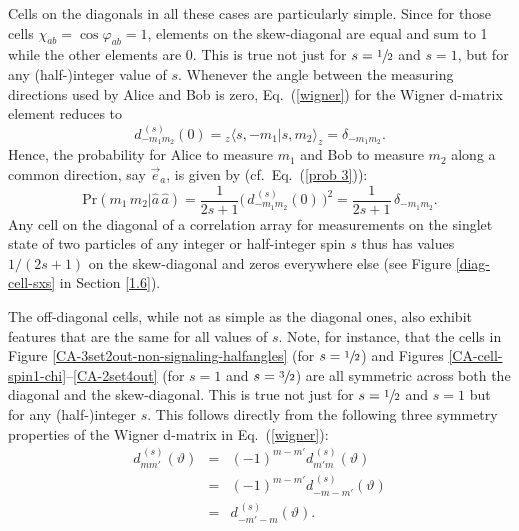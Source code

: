 Cells on the diagonals in all these cases are particularly simple. Since for those cells $\chi_{ab} = \cos{\varphi_{ab}} =1$, elements on the skew-diagonal are equal and sum to 1 while the other elements are 0. This is true not just for  $s = \sfrac12$ and $s = 1$, but for any (half-)integer value of $s$. Whenever the angle between the measuring directions used by Alice and Bob is zero,  Eq.\ (\ref{wigner}) for the Wigner d-matrix element reduces to   
\begin{equation}
d^{\,(s)}_{-m_1m_2}(0) = {_z} \langle s, -m_1  | s, m_2 \rangle_z=\delta_{-m_1m_2}.
\label{wigner zero}
\end{equation}
Hence, the probability for Alice to measure $m_1$ and Bob to measure $m_2$ along a common direction, say $\vec{e}_a$, is given by (cf.\ Eq.\ (\ref{prob 3})):
\begin{equation}
\mathrm{Pr}(m_1\, m_2 | \hat{a}\,\hat{a} ) = \frac{1}{2s+1} \Big( \, d^{\,(s)}_{-m_1m_2}(0) \, \Big)^{2\!}=\frac{1}{2s+1} \, \delta_{-m_1m_2}.
\label{prob 4}
\end{equation}
Any cell on the diagonal of a correlation array for measurements on the singlet state of two particles of any integer or half-integer spin $s$  thus has values $1/(2s+1)$ on the skew-diagonal and zeros everywhere else (see Figure \ref{diag-cell-sxs} in Section \ref{1.6}).  

The off-diagonal cells, while not as simple as the diagonal ones, also exhibit features that are the same for all values of $s$. Note, for instance, that the cells in Figure \ref{CA-3set2out-non-signaling-halfangles} (for $s = \sfrac12$) and Figures \ref{CA-cell-spin1-chi}--\ref{CA-2set4out} (for $s = 1$ and $s = \sfrac32$) are all symmetric across both the diagonal and the skew-diagonal. This is true not just for $s = \sfrac12$ and $s = 1$ but for any (half-)integer $s$. This follows directly from the following three symmetry properties of the Wigner d-matrix in Eq.\ (\ref{wigner}):
\begin{eqnarray}
d^{\,(s)}_{mm'}(\vartheta) 
&\!\!=\!\!& (-1)^{m-m'} d^{\,(s)}_{m' m}(\vartheta) \label{WignerD sym 1} \quad \\[.3 cm] 
&\!\!=\!\!& (-1)^{m-m'} d^{\,(s)}_{-m-m'}(\vartheta) \label{WignerD sym 2} \\[.3 cm]
&\!\!=\!\!& d^{\,(s)}_{-m'-m}(\vartheta). \label{WignerD sym 3}
\end{eqnarray}

